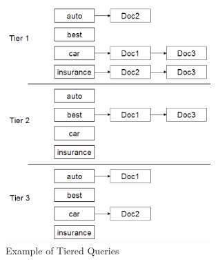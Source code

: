 \begin{figure}
		\includegraphics[width=0.7\textwidth]{Images/tieredIndex}
	\caption{Example of Tiered Queries}
	\label{img:tiered}
\end{figure}


